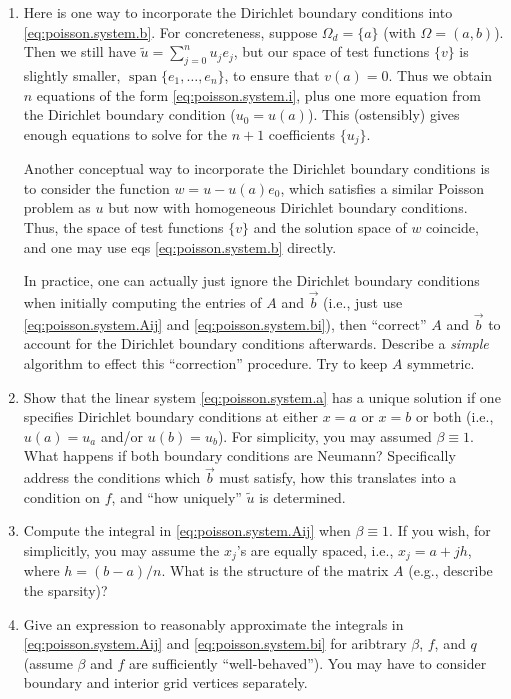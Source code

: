\begin{enumerate}

\item Here is one way to incorporate the Dirichlet boundary conditions into \eqref{eq:poisson.system.b}. For concreteness, suppose $\Omega_d = \{a\}$ (with $\Omega = (a,b)$). Then we still have $\tilde{u} = \sum_{j = 0}^n u_j e_j$, but our space of test functions $\{v\}$ is slightly smaller, $\operatorname{span} \{ e_1, \dotsc, e_n \}$, to ensure that $v(a) = 0$. Thus we obtain $n$ equations of the form \eqref{eq:poisson.system.i}, plus one more equation from the Dirichlet boundary condition ($u_0 = u(a)$). This (ostensibly) gives enough equations to solve for the $n + 1$ coefficients $\{u_j\}$.

Another conceptual way to incorporate the Dirichlet boundary conditions is to consider the function $w = u - u(a) e_0$, which satisfies a similar Poisson problem as $u$ but now with homogeneous Dirichlet boundary conditions. Thus, the space of test functions $\{v\}$ and the solution space of $w$ coincide, and one may use eqs \eqref{eq:poisson.system.b} directly.

In practice, one can actually just ignore the Dirichlet boundary conditions when initially computing the entries of $A$ and $\vec{b}$ (i.e., just use \eqref{eq:poisson.system.Aij} and \eqref{eq:poisson.system.bi}), then ``correct'' $A$ and $\vec{b}$ to account for the Dirichlet boundary conditions afterwards. Describe a \emph{simple} algorithm to effect this ``correction'' procedure. Try to keep $A$ symmetric.

\item Show that the linear system \eqref{eq:poisson.system.a} has a unique solution if one specifies Dirichlet boundary conditions at either $x = a$ or $x = b$ or both (i.e., $u(a) = u_a$ and/or $u(b) = u_b$). For simplicity, you may assumed $\beta \equiv 1$. What happens if both boundary conditions are Neumann? Specifically address the conditions which $\vec{b}$ must satisfy, how this translates into a condition on $f$, and ``how uniquely'' $\tilde{u}$ is determined.

\item Compute the integral in \eqref{eq:poisson.system.Aij} when $\beta \equiv 1$. If you wish, for simplicitly, you may assume the $x_j$'s are equally spaced, i.e., $x_j = a + j h$, where $h = (b - a)/n$. What is the structure of the matrix $A$ (e.g., describe the sparsity)?

\item Give an expression to reasonably approximate the integrals in \eqref{eq:poisson.system.Aij} and \eqref{eq:poisson.system.bi} for aribtrary $\beta$, $f$, and $q$ (assume $\beta$ and $f$ are sufficiently ``well-behaved''). You may have to consider boundary and interior grid vertices separately.


\end{enumerate}
